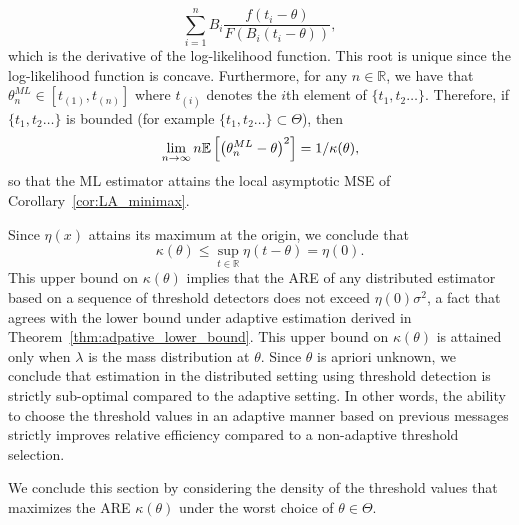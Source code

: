 \begin{equation}
\label{eq:ML}
\sum_{i=1}^n B_i \frac{f \left( t_i-\theta\right) }{F \left(B_i  (t_i-\theta)\right) },  
\end{equation}
which is the derivative of the log-likelihood function. This root is unique since the log-likelihood function is concave. Furthermore, for any $n \in \mathbb R$, we have that ${\theta}^{ML}_n  \in [t_{(1)}, t_{(n)}]$ where $t_{(i)}$ denotes the $i$th element of $\{t_1,t_2\ldots\}$. Therefore, if $\{t_1,t_2\ldots\}$ is bounded (for example $\{t_1,t_2\ldots\} \subset \Theta$), then 
\[
\lim_{n\to \infty} n \mathbb{E}\left[ \left({\theta}^{ML}_n - \theta \right)^2\right]  = 1/\kappa(\theta), 
\] 
so that the ML estimator attains the local asymptotic MSE of Corollary~\ref{cor:LA_minimax}. \par
%
Since $\eta(x)$ attains its maximum at the origin, we conclude that
\[
\kappa(\theta) \leq \sup_{t\in \mathbb R} \eta \left( t-\theta\right) = \eta(0).
\]
This upper bound on $\kappa(\theta)$ implies that the ARE of any distributed estimator based on a sequence of threshold detectors does not exceed $\eta(0)\sigma^2$, a fact that agrees with the lower bound under adaptive estimation derived in Theorem~\ref{thm:adpative_lower_bound}. 
%
This upper bound on $\kappa(\theta)$ is attained only when $\lambda$ is the mass distribution at $\theta$. Since $\theta$ is apriori unknown, we conclude that estimation in the distributed setting using threshold detection is strictly sub-optimal compared to the adaptive setting. In other words, the ability to choose the threshold values in an adaptive manner based on previous messages strictly improves relative efficiency compared to a non-adaptive threshold selection.  \par


%
We conclude this section by considering the density of the threshold values that maximizes the ARE $\kappa(\theta)$ under the worst choice of $\theta \in \Theta$.

